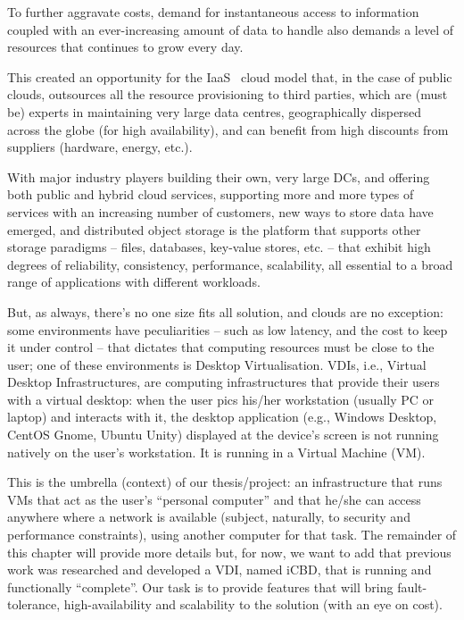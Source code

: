 To further aggravate costs, demand for instantaneous access to information coupled with an ever-increasing amount of data to handle also demands a level of resources that continues to grow every day.

This created an opportunity for the \gls{IaaS}~\cite{Mell2011} cloud model that, in the case of public clouds, outsources all the resource provisioning to third parties, which are (must be) experts in maintaining very large data centres, geographically dispersed across the globe (for high availability), and can benefit from high discounts from suppliers (hardware, energy, etc.).

With major industry players building their own, very large DCs, and offering both public and hybrid cloud services, supporting more and more types of services with an increasing number of customers, new ways to store data have emerged, and distributed object storage is the platform that supports other storage paradigms – files, databases, key-value stores, etc. – that exhibit high degrees of  reliability, consistency, performance, scalability, all essential to a broad range of applications with different workloads.

But, as always, there’s no one size fits all solution, and clouds are no exception: some environments have peculiarities – such as low latency, and the cost to keep it under control – that dictates that computing resources must be close to the user; one of these environments is Desktop Virtualisation.
VDIs, i.e., Virtual Desktop Infrastructures, are computing infrastructures that provide their users with a virtual desktop: when the user pics his/her workstation (usually PC or laptop) and interacts with it, the desktop application (e.g., Windows Desktop, CentOS Gnome, Ubuntu Unity) displayed at the device’s screen is not running natively on the user’s workstation. It is running in a Virtual Machine (VM).

This is the umbrella (context) of our thesis/project: an infrastructure that runs VMs that act as the user’s “personal computer” and that he/she can access anywhere where a network is available (subject, naturally, to security and performance constraints), using another computer for that task. The remainder of this chapter will provide more details but, for now, we want to add that previous work was researched and developed a VDI, named iCBD, that is running and functionally “complete”. Our task is to provide features that will bring fault-tolerance, high-availability and scalability to the solution (with an eye on cost).



